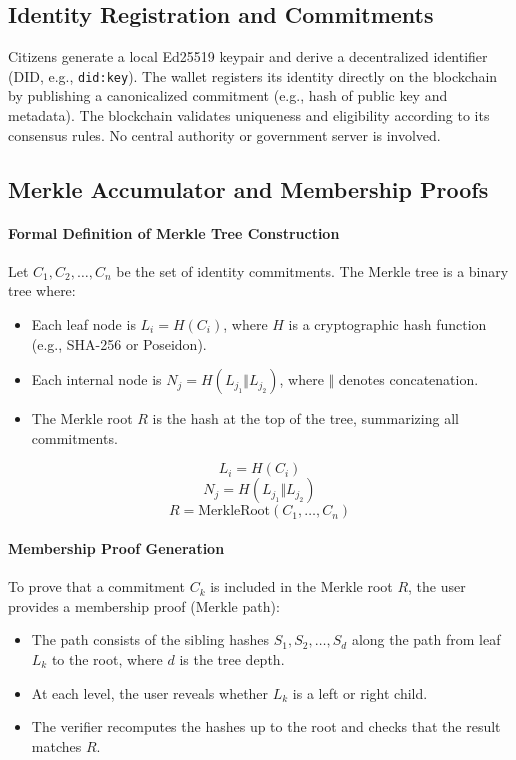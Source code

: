 \documentclass[12pt,a4paper]{report}
\begin{document}
\subsection{Identity Registration and Commitments}
Citizens generate a local Ed25519 keypair and derive a decentralized identifier (DID, e.g., \texttt{did:key}). The wallet registers its identity directly on the blockchain by publishing a canonicalized commitment (e.g., hash of public key and metadata). The blockchain validates uniqueness and eligibility according to its consensus rules. No central authority or government server is involved.

\subsection{Merkle Accumulator and Membership Proofs}

\paragraph{Formal Definition of Merkle Tree Construction}
Let $C_1, C_2, \ldots, C_n$ be the set of identity commitments. The Merkle tree is a binary tree where:
\begin{itemize}
  \item Each leaf node is $L_i = H(C_i)$, where $H$ is a cryptographic hash function (e.g., SHA-256 or Poseidon).
  \item Each internal node is $N_j = H(L_{j_1} \Vert L_{j_2})$, where $\Vert$ denotes concatenation.
  \item The Merkle root $R$ is the hash at the top of the tree, summarizing all commitments.
\end{itemize}

\begin{equation}
  L_i = H(C_i)
\end{equation}
\begin{equation}
  N_j = H(L_{j_1} \Vert L_{j_2})
\end{equation}
\begin{equation}
  R = \text{MerkleRoot}(C_1, \ldots, C_n)
\end{equation}

\paragraph{Membership Proof Generation}
To prove that a commitment $C_k$ is included in the Merkle root $R$, the user provides a membership proof (Merkle path):
\begin{itemize}
  \item The path consists of the sibling hashes $S_1, S_2, \ldots, S_d$ along the path from leaf $L_k$ to the root, where $d$ is the tree depth.
  \item At each level, the user reveals whether $L_k$ is a left or right child.
  \item The verifier recomputes the hashes up to the root and checks that the result matches $R$.
\end{itemize}
\end{document}
